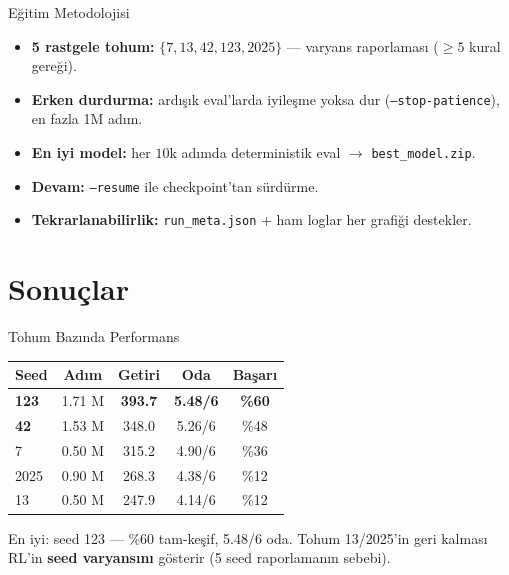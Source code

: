 \documentclass[aspectratio=169,11pt]{beamer}
\begin{document}
\begin{frame}{Eğitim Metodolojisi}
  \begin{itemize}
    \item \textbf{5 rastgele tohum:} $\{7, 13, 42, 123, 2025\}$ --- varyans
    raporlaması ($\ge 5$ kural gereği).
    \item \textbf{Erken durdurma:} ardışık eval'larda iyileşme yoksa dur
    (\texttt{--stop-patience}), en fazla 1M adım.
    \item \textbf{En iyi model:} her $10$k adımda deterministik eval $\rightarrow$
    \texttt{best\_model.zip}.
    \item \textbf{Devam:} \texttt{--resume} ile checkpoint'tan sürdürme.
    \item \textbf{Tekrarlanabilirlik:} \texttt{run\_meta.json} + ham loglar her
    grafiği destekler.
  \end{itemize}
\end{frame}

\section{Sonuçlar}
\begin{frame}{Tohum Bazında Performans}
  \begin{center}
  \begin{tabular}{lcccc}
    \toprule
    \textbf{Seed} & \textbf{Adım} & \textbf{Getiri} & \textbf{Oda} & \textbf{Başarı} \\
    \midrule
    \rowcolor{green!15} \textbf{123} & 1.71 M & \textbf{393.7} & \textbf{5.48/6} & \textbf{\%60} \\
    \textbf{42}  & 1.53 M & 348.0 & 5.26/6 & \%48 \\
    7            & 0.50 M & 315.2 & 4.90/6 & \%36 \\
    2025         & 0.90 M & 268.3 & 4.38/6 & \%12 \\
    13           & 0.50 M & 247.9 & 4.14/6 & \%12 \\
    \bottomrule
  \end{tabular}
  \end{center}
  \vfill
  \footnotesize
  En iyi: \alert{seed 123} --- \%60 tam-keşif, 5.48/6 oda. Tohum 13/2025'in geri
  kalması RL'in \textbf{seed varyansını} gösterir (5 seed raporlamanın sebebi).
\end{frame}
\end{document}
